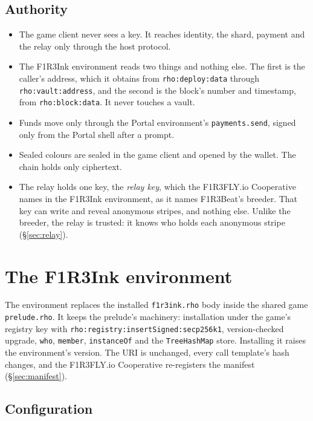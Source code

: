 \documentclass[11pt,a4paper]{article}
\newcommand{\code}[1]{\texttt{#1}}
\begin{document}
\subsection{Authority}

\begin{itemize}[leftmargin=1.2em,itemsep=2pt]
\item The game client never sees a key. It reaches identity, the shard, payment and the relay
  only through the host protocol.
\item The F1R3Ink environment reads two things and nothing else. The first is the caller's
  address, which it obtains from \code{rho:deploy:data} through \code{rho:vault:\allowbreak address}, and the second is the block's
  number and timestamp, from \code{rho:block:data}. It never touches a vault.
\item Funds move only through the Portal environment's \code{payments.send}, signed only from
  the Portal shell after a prompt.
\item Sealed colours are sealed in the game client and opened by the wallet. The chain holds only
  ciphertext.
\item The relay holds one key, the \emph{relay key}, which the F1R3FLY.io Cooperative names in
  the F1R3Ink environment, as it names F1R3Beat's breeder. That key can write and reveal
  anonymous stripes, and nothing else. Unlike the breeder, the relay is trusted: it knows who
  holds each anonymous stripe (\S\ref{sec:relay}).
\end{itemize}

\section{The F1R3Ink environment}\label{sec:env}

The environment replaces the installed \code{f1r3ink.rho} body inside the shared game
\code{prelude.rho}. It keeps the prelude's machinery: installation under the game's registry
key with \code{rho:registry:\allowbreak insertSigned:\allowbreak secp256k1}, version-checked upgrade, \code{who},
\code{member}, \code{instanceOf} and the \code{TreeHashMap} store. Installing it raises the
environment's version. The URI is unchanged, every call template's hash changes, and the F1R3FLY.io
Cooperative re-registers the manifest (\S\ref{sec:manifest}).

\subsection{Configuration}
\end{document}
